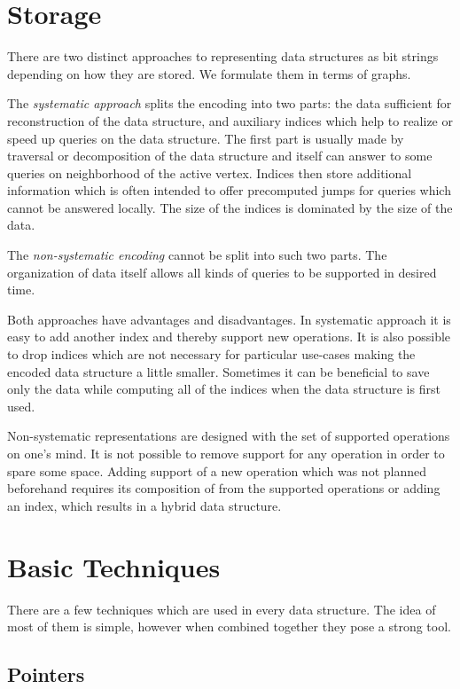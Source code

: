 \section{Storage}

There are two distinct approaches to representing data structures as bit strings depending on how they are stored.
We formulate them in terms of graphs.

The \emph{systematic approach} splits the encoding into two parts: the data sufficient for reconstruction of the data structure, and auxiliary indices which help to realize or speed up queries on the data structure.
The first part is usually made by traversal or decomposition of the data structure and itself can answer to some queries on neighborhood of the active vertex.
Indices then store additional information which is often intended to offer precomputed jumps for queries which cannot be answered locally.
The size of the indices is dominated by the size of the data.

The \emph{non-systematic encoding} cannot be split into such two parts.
The organization of data itself allows all kinds of queries to be supported in desired time.

Both approaches have advantages and disadvantages.
In systematic approach it is easy to add another index and thereby support new operations.
It is also possible to drop indices which are not necessary for particular use-cases making the encoded data structure a little smaller.
Sometimes it can be beneficial to save only the data while computing all of the indices when the data structure is first used.

Non-systematic representations are designed with the set of supported operations on one's mind.
It is not possible to remove support for any operation in order to spare some space.
Adding support of a new operation which was not planned beforehand requires its composition of from the supported operations or adding an index, which results in a hybrid data structure.

\section{Basic Techniques}

There are a few techniques which are used in every data structure.
The idea of most of them is simple, however when combined together they pose a strong tool.

\subsection{Pointers}

